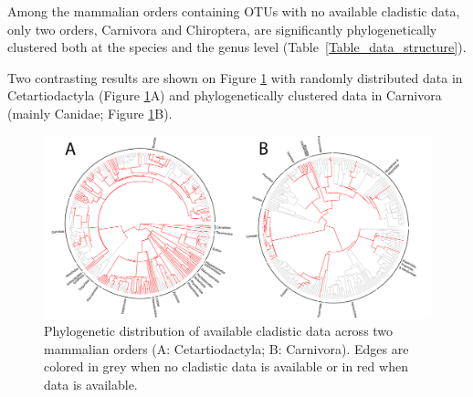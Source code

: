 \documentclass[12pt,letterpaper]{article}
\begin{document}
\renewcommand\baselinestretch{1.2}\selectfont
\begin{center}

\end{center}
\renewcommand\baselinestretch{2}\selectfont

Among the mammalian orders containing OTUs with no available cladistic data, only two orders, Carnivora and Chiroptera, are significantly phylogenetically clustered both at the species and the genus level (Table~\ref{Table_data_structure}).

\renewcommand\baselinestretch{1.2}\selectfont
\begin{center}

\end{center}
\renewcommand\baselinestretch{2}\selectfont

Two contrasting results are shown on Figure \ref{Figure_example_coverage} with randomly distributed data in Cetartiodactyla (Figure \ref{Figure_example_coverage}A) and phylogenetically clustered data in Carnivora (mainly Canidae; Figure \ref{Figure_example_coverage}B).

\begin{figure}[!htbp]
\centering
    \includegraphics[width=1\textwidth]{example_coverage.pdf}
\caption{Phylogenetic distribution of available cladistic data across two mammalian orders (A: Cetartiodactyla; B: Carnivora).
Edges are colored in grey when no cladistic data is available or in red when data is available.}
\label{Figure_example_coverage}
\end{figure}
\end{document}
